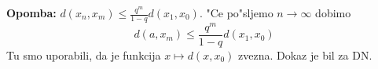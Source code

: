 \textbf{Opomba:} $d(x_n, x_m) \leq \frac{q^m}{1-q} d(x_1, x_0)$. "Ce po"sljemo $n \to \infty$ dobimo
\begin{equation*}
d(a, x_m) \leq \dfrac{q^m}{1-q} d(x_1, x_0)
\end{equation*}
Tu smo uporabili, da je funkcija $x \mapsto d(x, x_0)$ zvezna. Dokaz je bil za DN.
